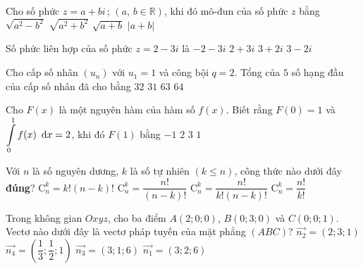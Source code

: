 \begin{ex}%
	Cho số phức $z=a+bi\,;\,( a,\,b\in \mathbb{R} )$, khi đó mô-đun của số phức $z$ bằng
	\choice
	{$\sqrt{a^2-b^2}$ }
	{\True $\sqrt{a^2+b^2}$}
	{$\sqrt{a+b}$}
	{$\left| a+b \right|$}
\end{ex}
\begin{ex}%
	Số phức liên hợp của số phức $z=2-3i$ là
	\choice
	{$-2-3i$}
	{\True $2+3i$}
	{$3+2i$}
	{$3-2i$}
\end{ex}
\begin{ex}%
	Cho cấp số nhân $( u_n )$ với $u_1=1$ và công bội $q=2$. Tổng của $5$ số hạng đầu của cấp số nhân đã cho bằng 
	\choice
	{$32$ }
	{\True $31$}
	{$63$}
	{$64$}
\end{ex}
\begin{ex}%
	Cho $F( x )$ là một nguyên hàm của hàm số $f( x )$. Biết rằng $F( 0 )=1$ và $\displaystyle\int\limits_0^1{f( x )} \text{\, d}x=2$, khi đó $F( 1 )$ bằng 
	\choice
	{$-1$}
	{$2$}
	{\True $3$}
	{$1$}
\end{ex}
\begin{ex}%
	Với $n$ là số nguyên dương, $k$ là số tự nhiên $( k\le n )$, công thức nào dưới đây \textbf{đúng}?
	\choice
	{$\mathrm{C}_n^k=k!( n-k )!$ }
	{$\mathrm{C}_n^k=\dfrac{n!}{( n-k )!}$}
	{\True $\mathrm{C}_n^k=\dfrac{n!}{k!( n-k )!}$ }
	{$\mathrm{C}_n^k=\dfrac{n!}{k!}$}
\end{ex}
\begin{ex}%
	Trong không gian $Oxyz$, cho ba điểm $A( 2;0;0 )$, $B( 0;3;0 )$ và $C( 0;0;1 )$. Vectơ nào dưới đây là vectơ pháp tuyến của mặt phẳng $( ABC )$?
	\choice
	{$\overrightarrow{n_2}=( 2;3;1 )$}
	{$\overrightarrow{n_4}=( \dfrac{1}{3};\dfrac{1}{2};1 )$}
	{$\overrightarrow{n_3}=( 3;1;6 )$}
	{\True $\overrightarrow{n_1}=( 3;2;6 )$}
\end{ex}

